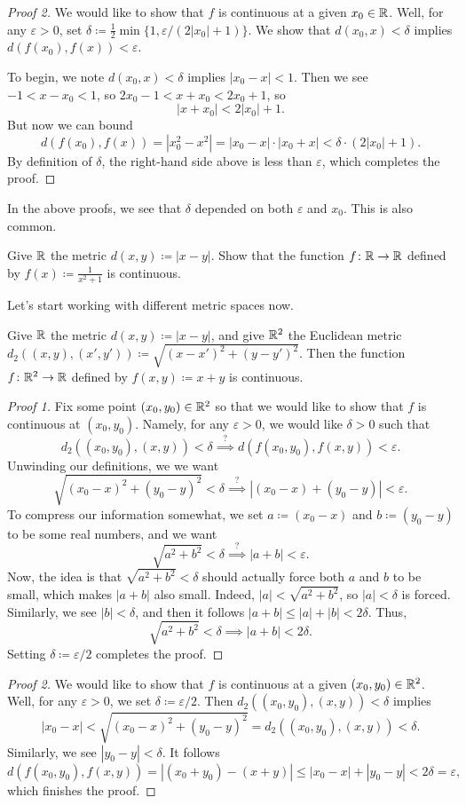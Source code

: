 \documentclass[../main.tex]{subfiles}
\begin{document}
\begin{proof}[Proof 2]
    We would like to show that $f$ is continuous at a given $x_0\in\mathbb R$. Well, for any $\varepsilon>0$, set $\delta\coloneqq\frac12\min\{1,\varepsilon/(2|x_0|+1)\}$. We show that $d(x_0,x)<\delta$ implies $d(f(x_0),f(x))<\varepsilon$.

    To begin, we note $d(x_0,x)<\delta$ implies $|x_0-x|<1$. Then we see $-1<x-x_0<1$, so $2x_0-1<x+x_0<2x_0+1$, so
    \[|x+x_0|<2|x_0|+1.\]
    But now we can bound
    \[d(f(x_0),f(x))=\left|x_0^2-x^2\right|=|x_0-x|\cdot|x_0+x|<\delta\cdot(2|x_0|+1).\]
    By definition of $\delta$, the right-hand side above is less than $\varepsilon$, which completes the proof.
\end{proof}
In the above proofs, we see that $\delta$ depended on both $\varepsilon$ and $x_0$. This is also common.
\begin{exercise}
    Give $\mathbb R$ the metric $d(x,y)\coloneqq|x-y|$. Show that the function $f\colon\mathbb R\to\mathbb R$ defined by $f(x)\coloneqq\frac1{x^2+1}$ is continuous.
\end{exercise}
Let's start working with different metric spaces now.
\begin{example}
    Give $\mathbb R$ the metric $d(x,y)\coloneqq|x-y|$, and give $\mathbb R^2$ the Euclidean metric $d_2((x,y),(x',y'))\coloneqq\sqrt{(x-x')^2+(y-y')^2}$. Then the function $f\colon\mathbb R^2\to\mathbb R$ defined by $f(x,y)\coloneqq x+y$ is continuous.
\end{example}
\begin{proof}[Proof 1]
    Fix some point $(x_0,y_0)\in\mathbb R^2$ so that we would like to show that $f$ is continuous at $(x_0,y_0)$. Namely, for any $\varepsilon>0$, we would like $\delta>0$ such that
    \[d_2((x_0,y_0),(x,y))<\delta\stackrel?\implies d(f(x_0,y_0),f(x,y))<\varepsilon.\]
    Unwinding our definitions, we we want
    \[\sqrt{(x_0-x)^2+(y_0-y)^2}<\delta\stackrel?\implies|(x_0-x)+(y_0-y)|<\varepsilon.\]
    To compress our information somewhat, we set $a\coloneqq(x_0-x)$ and $b\coloneqq(y_0-y)$ to be some real numbers, and we want
    \[\sqrt{a^2+b^2}<\delta\stackrel?\implies|a+b|<\varepsilon.\]
    Now, the idea is that $\sqrt{a^2+b^2}<\delta$ should actually force both $a$ and $b$ to be small, which makes $|a+b|$ also small. Indeed, $|a|<\sqrt{a^2+b^2}$, so $|a|<\delta$ is forced. Similarly, we see $|b|<\delta$, and then it follows $|a+b|\le|a|+|b|<2\delta$. Thus,
    \[\sqrt{a^2+b^2}<\delta\implies|a+b|<2\delta.\]
    Setting $\delta\coloneqq\varepsilon/2$ completes the proof.
\end{proof}
\begin{proof}[Proof 2]
    We would like to show that $f$ is continuous at a given $(x_0,y_0)\in\mathbb R^2$. Well, for any $\varepsilon>0$, we set $\delta\coloneqq\varepsilon/2$. Then $d_2((x_0,y_0),(x,y))<\delta$ implies
    \[|x_0-x|<\sqrt{(x_0-x)^2+(y_0-y)^2}=d_2((x_0,y_0),(x,y))<\delta.\]
    Similarly, we see $|y_0-y|<\delta$. It follows
    \[d(f(x_0,y_0),f(x,y))=|(x_0+y_0)-(x+y)|\le|x_0-x|+|y_0-y|<2\delta=\varepsilon,\]
    which finishes the proof.
\end{proof}
\end{document}

